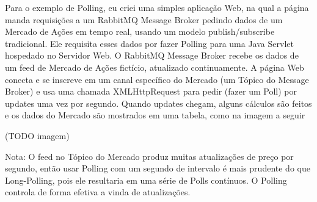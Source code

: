 \documentclass[a4paper,12pt]{article}
\begin{document}
Para o exemplo de Polling, eu criei uma simples aplicação Web, na qual a página manda requisições a um RabbitMQ Message Broker pedindo dados de um Mercado de Ações em tempo real, usando um modelo publish/subscribe tradicional. Ele requisita esses dados por fazer Polling para uma Java Servlet hospedado no Servidor Web. O RabbitMQ Message Broker recebe os dados de um feed de Mercado de Ações fictício, atualizado continuamente. A página Web conecta e se inscreve em um canal específico do Mercado (um Tópico do Message Broker) e usa uma chamada XMLHttpRequest para pedir (fazer um Poll) por updates uma vez por segundo. Quando updates chegam, alguns cálculos são feitos e os dados do Mercado são mostrados em uma tabela, como na imagem a seguir

(TODO imagem)

Nota: O feed no Tópico do Mercado produz muitas atualizações de preço por segundo, então usar Polling com um segundo de intervalo é mais prudente do que Long-Polling, pois ele resultaria em uma série de Polls contínuos. O Polling controla de forma efetiva a vinda de atualizações.
\end{document}
